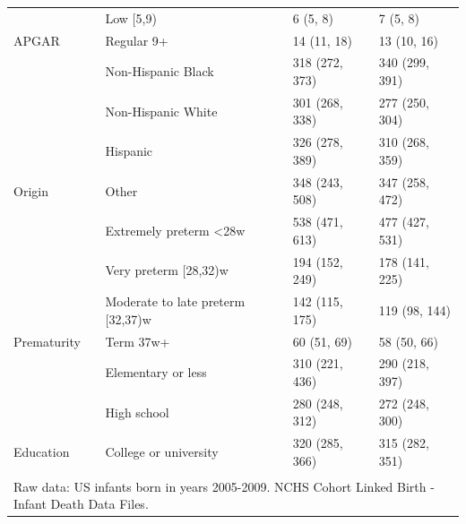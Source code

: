 \documentclass[10pt, twoside, parskip=half]{article}
\begin{document}
\begin{table}[t]
\begin{tabular}{llll}
 & Low [5,9) & 6 (5, 8) & 7 (5, 8)\\

\multirow{-3}{*}{\raggedright\arraybackslash \hspace{1em}APGAR} & Regular 9+ & 14 (11, 18) & 13 (10, 16)\\
\cmidrule{1-4}
 & Non-Hispanic Black & 318 (272, 373) & 340 (299, 391)\\

 & Non-Hispanic White & 301 (268, 338) & 277 (250, 304)\\

 & Hispanic & 326 (278, 389) & 310 (268, 359)\\

\multirow{-4}{*}{\raggedright\arraybackslash \hspace{1em}Origin} & Other & 348 (243, 508) & 347 (258, 472)\\
\cmidrule{1-4}
 & Extremely preterm <28w & 538 (471, 613) & 477 (427, 531)\\

 & Very preterm [28,32)w & 194 (152, 249) & 178 (141, 225)\\

 & Moderate to late preterm [32,37)w & 142 (115, 175) & 119 (98, 144)\\

\multirow{-4}{*}{\raggedright\arraybackslash \hspace{1em}Prematurity} & Term 37w+ & 60 (51, 69) & 58 (50, 66)\\
\cmidrule{1-4}
 & Elementary or less & 310 (221, 436) & 290 (218, 397)\\

 & High school & 280 (248, 312) & 272 (248, 300)\\

\multirow{-3}{*}{\raggedright\arraybackslash \hspace{1em}Education} & College or university & 320 (285, 366) & 315 (282, 351)\\
\bottomrule
\multicolumn{4}{l}{\textsuperscript{} Raw data: US infants born in years 2005-2009. NCHS Cohort Linked Birth - Infant Death Data Files.}\\
\end{tabular}
\end{table}

\clearpage
\end{document}
